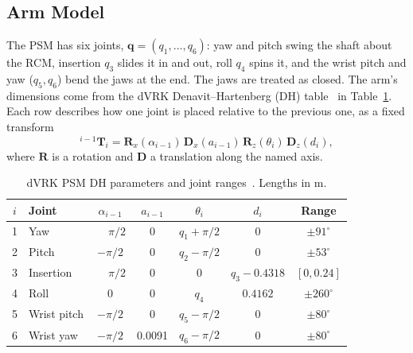 \subsection{Arm Model}\label{sec:kin}
The PSM has six joints,
$\mathbf q=(q_1,\dots,q_6)$: yaw and pitch swing the shaft about the RCM,
insertion $q_3$ slides it in and out, roll $q_4$ spins it, and the wrist
pitch and yaw ($q_5,q_6$) bend the jaws at the end. The jaws are treated as
closed. The arm's dimensions come from the dVRK Denavit--Hartenberg (DH)
table~\cite{craig2005,sawIntuitive} in Table~\ref{tab:dh}. Each row describes
how one joint is placed relative to the previous one, as a fixed transform
\begin{equation}
  {}^{i-1}\mathbf T_i=\mathbf R_x(\alpha_{i-1})\,\mathbf D_x(a_{i-1})\,
  \mathbf R_z(\theta_i)\,\mathbf D_z(d_i),
\end{equation}
where $\mathbf R$ is a rotation and $\mathbf D$ a translation along the named
axis.

\begin{table}[t]
\centering
\caption{dVRK PSM DH parameters and joint ranges~\cite{sawIntuitive}.
Lengths in m.}
\label{tab:dh}
\footnotesize
\setlength{\tabcolsep}{3.5pt}
\begin{tabular}{@{}clcccc c@{}}
\hline
$i$ & Joint & $\alpha_{i-1}$ & $a_{i-1}$ & $\theta_i$ & $d_i$ & Range\\
\hline
1 & Yaw        & $\phantom{-}\pi/2$ & 0      & $q_1+\pi/2$ & 0               & $\pm91^\circ$\\
2 & Pitch      & $-\pi/2$ & 0      & $q_2-\pi/2$ & 0               & $\pm53^\circ$\\
3 & Insertion  & $\phantom{-}\pi/2$ & 0      & 0           & $q_3-0.4318$    & $[0,0.24]$\\
4 & Roll       & 0        & 0      & $q_4$       & $0.4162$        & $\pm260^\circ$\\
5 & Wrist pitch& $-\pi/2$ & 0      & $q_5-\pi/2$ & 0               & $\pm80^\circ$\\
6 & Wrist yaw  & $-\pi/2$ & 0.0091 & $q_6-\pi/2$ & 0               & $\pm80^\circ$\\
\hline
\end{tabular}
\end{table}

